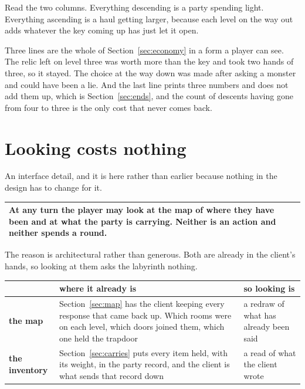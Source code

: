 \documentclass[11pt,a4paper]{article}
\begin{document}
Read the two columns. Everything descending is a party spending light. Everything ascending is a
haul getting larger, because each level on the way out adds whatever the key coming up has just
let it open.

Three lines are the whole of Section~\ref{sec:economy} in a form a player can see. The relic left
on level three was worth more than the key and took two hands of three, so it stayed. The choice
at the way down was made after asking a monster and could have been a lie. And the last line
prints three numbers and does not add them up, which is Section~\ref{sec:ends}, and the count of
descents having gone from four to three is the only cost that never comes back.

\section{Looking costs nothing}
\label{sec:looking}

An interface detail, and it is here rather than earlier because nothing in the design has to change
for it.

\begin{center}
\begin{tabular}{@{}>{\raggedright\arraybackslash}p{}@{}}
\toprule
\textbf{At any turn the player may look at the map of where they have been and at what the party is
carrying. Neither is an action and neither spends a round.} \\
\bottomrule
\end{tabular}
\end{center}

The reason is architectural rather than generous. Both are already in the client's hands, so
looking at them asks the labyrinth nothing.

\begin{center}
\begin{tabular}{@{}l@{\hspace{4mm}}>{\raggedright\arraybackslash}p{}@{\hspace{4mm}}>{\raggedright\arraybackslash}p{}@{}}
\toprule
& \textbf{where it already is} & \textbf{so looking is} \\
\midrule
\textbf{the map} & Section~\ref{sec:map} has the client keeping every response that came back up.
Which rooms were on each level, which doors joined them, which one held the trapdoor &
a redraw of what has already been said \\[1mm]
\textbf{the inventory} & Section~\ref{sec:carries} puts every item held, with its weight, in the
party record, and the client is what sends that record down &
a read of what the client wrote \\
\bottomrule
\end{tabular}
\end{center}
\end{document}

